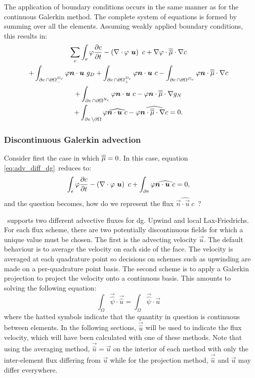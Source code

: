 The application of boundary conditions occurs in the same manner as for the
continuous Galerkin method. The complete system of equations is formed
by summing over all the elements. Assuming weakly applied boundary
conditions, this results in:
\begin{multline}
  \sum_e \int_e \varphi \frac{\partial c}{\partial t} 
  - \left(\nabla\cdot \varphi~{\mbox{\boldmath$u$}}\right)~c 
  + \nabla\varphi\cdot\overline{\overline{\mu}}\cdot\nabla c\\
  + \int_{\partial e\,\cap{\partial\Omega}^{D_c}_{-}} \varphi{\mbox{\boldmath$n$}}\cdot{\mbox{\boldmath$u$}}~g_D  
  + \int_{\partial e\,\cap{\partial\Omega}^{D_c}_{+}} \varphi{\mbox{\boldmath$n$}}\cdot{\mbox{\boldmath$u$}}~c  
  - \int_{\partial e\,\cap{\partial\Omega}^{D_c}}
  \varphi{\mbox{\boldmath$n$}}\cdot\overline{\overline{\mu}}\cdot\nabla c\\
  + \int_{\partial e\,\cap{\partial\Omega}^{N_c}} \varphi{\mbox{\boldmath$n$}}\cdot{\mbox{\boldmath$u$}}~c 
  - \varphi{\mbox{\boldmath$n$}}\cdot\overline{\overline{\mu}}\cdot\nabla g_N\\
  + \int_{\partial e\,\setminus{\partial\Omega}} \varphi\widehat{{\mbox{\boldmath$n$}}\cdot{\mbox{\boldmath$u$}}~c} 
  - \varphi\widehat{{\mbox{\boldmath$n$}}\cdot\overline{\overline{\mu}}\cdot\nabla c}
    = 0.      
\end{multline}

\subsubsection{Discontinuous Galerkin advection}
\label{Sect:ND_discontinuous_galerkin_advection}

Consider first the case in which $\overline{\overline{\mu}}=0$. In this case, equation
\eqref{eq:adv_diff_dg}\ reduces to:
\begin{equation}\label{eq:adv_dg}
  \int_e \varphi \frac{\partial c}{\partial t} -
    \left(\nabla\cdot \varphi~{\mbox{\boldmath$u$}}\right)~c +
    \int_{\partial e} \varphi\widehat{{\mbox{\boldmath$n$}}\cdot{\mbox{\boldmath$u$}}~c} 
    = 0,
\end{equation}
and the question becomes, how do we represent the flux
$\widehat{\vec{n}\cdot\vec{u}~c}$\ ?

\fluidity\ supports two different advective fluxes for dg. Upwind and local
Lax-Friedrichs. For each flux scheme, there are two potentially
discontinuous fields for which a unique value must be chosen. The first is
the advecting velocity $\vec{u}$. The default behaviour is to average the
velocity on each side of the face. The velocity is averaged at each
quadrature point so decisions on schemes such as upwinding are made on a
per-quadrature point basis. The second scheme is to apply a Galerkin
projection to project the velocity onto a continuous basis. This amounts to
solving the following equation:
\begin{equation}
  \int_\Omega \vec{\hat{\psi}} \cdot\vec{\hat{u}} 
  = \int_\Omega \vec{\hat{\psi}}\cdot \vec{u} 
\end{equation}
where the hatted symbols indicate that the quantity in question is
continuous between elements. In the following sections, $\vec{\hat{u}}$ will
be used to indicate the flux velocity, which will have been calculated with
one of these methods. Note that using the averaging method,
$\vec{\hat{u}}=\vec{u}$ on the interior of each method with only the inter-element
flux differing from $\vec{u}$ while for the projection method, $\vec{\hat
  u}$ and $\vec{u}$ may differ everywhere.

